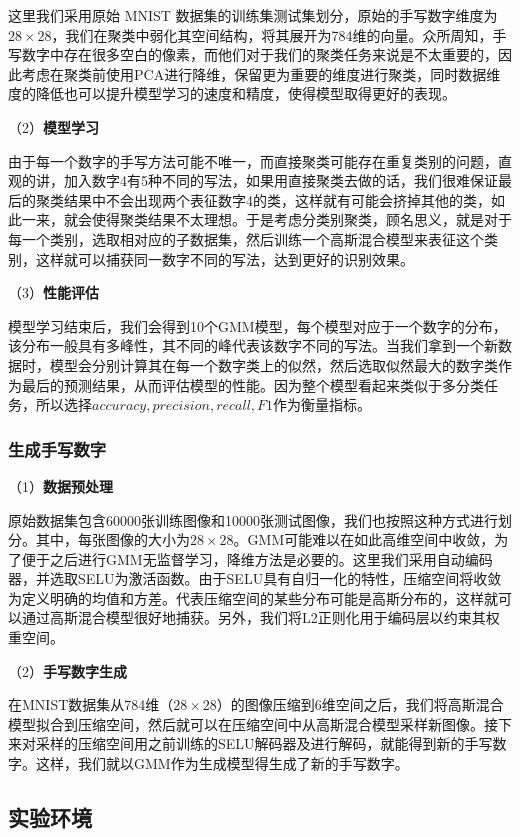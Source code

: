 \documentclass[UTF8]{ctexart}
\begin{document}
这里我们采用原始 MNIST 数据集的训练集测试集划分，原始的手写数字维度为$28 \times 28$，我们在聚类中弱化其空间结构，将其展开为784维的向量。众所周知，手写数字中存在很多空白的像素，而他们对于我们的聚类任务来说是不太重要的，因此考虑在聚类前使用PCA进行降维，保留更为重要的维度进行聚类，同时数据维度的降低也可以提升模型学习的速度和精度，使得模型取得更好的表现。

（2）\textbf{模型学习}

由于每一个数字的手写方法可能不唯一，而直接聚类可能存在重复类别的问题，直观的讲，加入数字4有5种不同的写法，如果用直接聚类去做的话，我们很难保证最后的聚类结果中不会出现两个表征数字4的类，这样就有可能会挤掉其他的类，如此一来，就会使得聚类结果不太理想。于是考虑分类别聚类，顾名思义，就是对于每一个类别，选取相对应的子数据集，然后训练一个高斯混合模型来表征这个类别，这样就可以捕获同一数字不同的写法，达到更好的识别效果。

（3）\textbf{性能评估}

模型学习结束后，我们会得到10个GMM模型，每个模型对应于一个数字的分布，该分布一般具有多峰性，其不同的峰代表该数字不同的写法。当我们拿到一个新数据时，模型会分别计算其在每一个数字类上的似然，然后选取似然最大的数字类作为最后的预测结果，从而评估模型的性能。因为整个模型看起来类似于多分类任务，所以选择$accuracy, precision, recall, F1$作为衡量指标。

\subsubsection{生成手写数字}

（1）\textbf{数据预处理}

原始数据集包含60000张训练图像和10000张测试图像，我们也按照这种方式进行划分。其中，每张图像的大小为$28 \times 28$。GMM可能难以在如此高维空间中收敛，为了便于之后进行GMM无监督学习，降维方法是必要的。这里我们采用自动编码器，并选取SELU为激活函数。由于SELU具有自归一化的特性，压缩空间将收敛为定义明确的均值和方差。代表压缩空间的某些分布可能是高斯分布的，这样就可以通过高斯混合模型很好地捕获。另外，我们将L2正则化用于编码层以约束其权重空间。

（2）\textbf{手写数字生成}

在MNIST数据集从784维（$28 \times 28$）的图像压缩到6维空间之后，我们将高斯混合模型拟合到压缩空间，然后就可以在压缩空间中从高斯混合模型采样新图像。接下来对采样的压缩空间用之前训练的SELU解码器及进行解码，就能得到新的手写数字。这样，我们就以GMM作为生成模型得生成了新的手写数字。

\subsection{实验环境}
\end{document}
